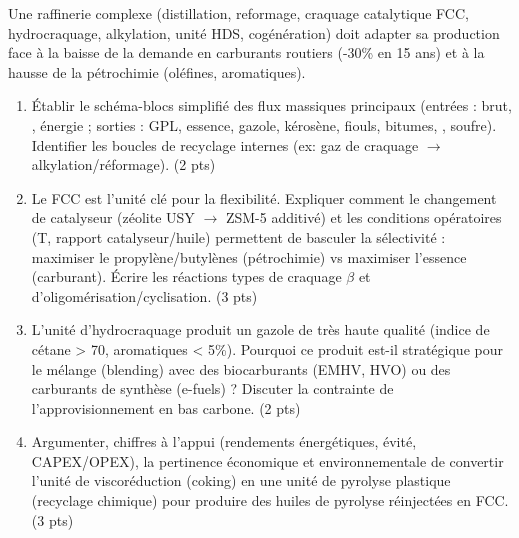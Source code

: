 \documentclass[11pt]{article}
\begin{document}
\begin{exercice}
Une raffinerie complexe (distillation, reformage, craquage catalytique FCC, hydrocraquage, alkylation, unité HDS, cogénération) doit adapter sa production face à la baisse de la demande en carburants routiers (-30\% en 15 ans) et à la hausse de la pétrochimie (oléfines, aromatiques).

\begin{enumerate}
\item Établir le schéma-blocs simplifié des flux massiques principaux (entrées : brut, , énergie ; sorties : GPL, essence, gazole, kérosène, fiouls, bitumes, , soufre). Identifier les boucles de recyclage internes (ex: gaz de craquage $\to$ alkylation/réformage). \hfill (2 pts)
\item Le FCC est l'unité clé pour la flexibilité. Expliquer comment le changement de catalyseur (zéolite USY $\to$ ZSM-5 additivé) et les conditions opératoires (T, rapport catalyseur/huile) permettent de basculer la sélectivité : maximiser le propylène/butylènes (pétrochimie) vs maximiser l'essence (carburant). Écrire les réactions types de craquage $\beta$ et d'oligomérisation/cyclisation. \hfill (3 pts)
\item L'unité d'hydrocraquage produit un gazole de très haute qualité (indice de cétane > 70, aromatiques < 5\%). Pourquoi ce produit est-il stratégique pour le mélange (blending) avec des biocarburants (EMHV, HVO) ou des carburants de synthèse (e-fuels) ? Discuter la contrainte de l'approvisionnement en  bas carbone. \hfill (2 pts)
\item Argumenter, chiffres à l'appui (rendements énergétiques,  évité, CAPEX/OPEX), la pertinence économique et environnementale de convertir l'unité de viscoréduction (coking) en une unité de pyrolyse plastique (recyclage chimique) pour produire des huiles de pyrolyse réinjectées en FCC. \hfill (3 pts)
\end{enumerate}
\end{exercice}
\end{document}
